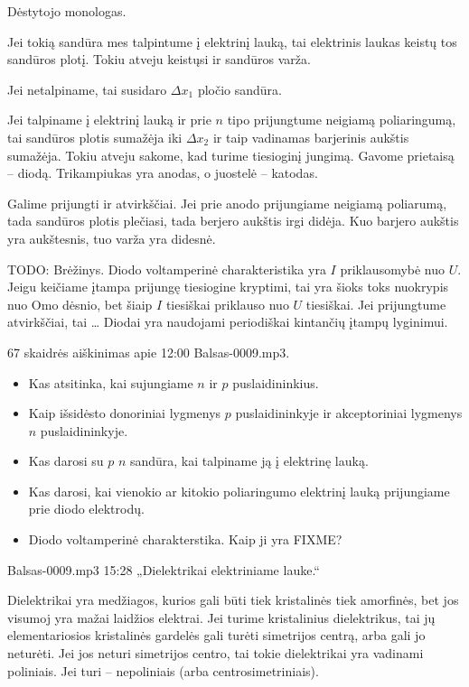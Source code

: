 \begin{note}
  Dėstytojo monologas.

  Jei tokią sandūra mes talpintume į elektrinį lauką, tai elektrinis
  laukas keistų tos sandūros plotį. Tokiu atveju keistųsi ir
  sandūros varža.

  Jei netalpiname, tai susidaro $\Delta x_{1}$ pločio sandūra.

  Jei talpiname į elektrinį lauką ir prie $n$ tipo prijungtume
  neigiamą poliaringumą, tai sandūros plotis sumažėja iki
  $\Delta x_{2}$ ir taip vadinamas barjerinis aukštis 
  sumažėja. Tokiu atveju sakome, kad turime tiesioginį
  jungimą. Gavome prietaisą – diodą. Trikampiukas yra anodas,
  o juostelė – katodas.

  Galime prijungti ir atvirkščiai. Jei prie anodo prijungiame
  neigiamą poliarumą, tada sandūros plotis plečiasi, tada
  berjero aukštis irgi didėja. Kuo barjero aukštis yra aukštesnis,
  tuo varža yra didesnė.

  TODO: Brėžinys. Diodo voltamperinė charakteristika yra $I$
  priklausomybė nuo $U$. Jeigu keičiame įtampa prijungę tiesiogine
  kryptimi, tai yra šioks toks nuokrypis nuo Omo dėsnio, bet
  šiaip $I$ tiesiškai priklauso nuo $U$ tiesiškai. Jei prijungtume
  atvirkščiai, tai … Diodai yra naudojami periodiškai kintančių
  įtampų lyginimui.

  67 skaidrės aiškinimas apie 12:00 Balsas-0009.mp3.

  \begin{itemize}
    \item Kas atsitinka, kai sujungiame $n$ ir $p$ puslaidininkius.
    \item Kaip išsidėsto donoriniai lygmenys $p$ puslaidininkyje
      ir akceptoriniai lygmenys $n$ puslaidininkyje.
    \item Kas darosi su $p$ $n$ sandūra, kai talpiname ją į elektrinę
      lauką.
    \item Kas darosi, kai vienokio ar kitokio poliaringumo elektrinį
      lauką prijungiame prie diodo elektrodų.
    \item Diodo voltamperinė charakterstika. Kaip ji yra FIXME?
  \end{itemize}

  Balsas-0009.mp3 15:28 „Dielektrikai elektriniame lauke.“

  Dielektrikai yra medžiagos, kurios gali būti tiek kristalinės
  tiek amorfinės, bet jos visumoj yra mažai laidžios elektrai.
  Jei turime kristalinius dielektrikus, tai jų elementariosios
  kristalinės gardelės gali turėti simetrijos centrą, arba gali
  jo neturėti. Jei jos neturi simetrijos centro, tai tokie
  dielektrikai yra vadinami poliniais. Jei turi – nepoliniais
  (arba centrosimetriniais).


\end{note}
